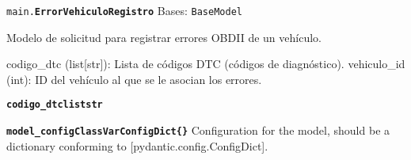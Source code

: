 \documentclass[a4paper,11pt,spanish]{sphinxmanual}
\newcommand{\robotoMonoBold}{\fontseries{b}\selectfont\ttfamily}
\renewcommand{\sphinxcode}[1]{\textcolor{sphinxorangeCode}{{\robotoMonoBold #1}}}
\renewcommand{\sphinxbfcode}[1]{\textbf{\sphinxcode{#1}}}
\renewcommand{\sphinxupquote}[1]{\texttt{#1}}
\begin{document}

\begin{fulllineitems}
\label{\detokenize{modelos:main.ErrorVehiculoRegistro}}
\pysigstartsignatures
\pysiglinewithargsret
{\sphinxbfcode{\sphinxupquote{}}\sphinxcode{\sphinxupquote{main.}}\sphinxbfcode{\sphinxupquote{ErrorVehiculoRegistro}}}
{\sphinxparamcomma {}\sphinxparamcomma {}}
{}
\pysigstopsignatures
\sphinxAtStartPar
Bases: \sphinxcode{\sphinxupquote{BaseModel}}

\sphinxAtStartPar
Modelo de solicitud para registrar errores OBD\sphinxhyphen{}II de un vehículo.
\begin{description}
\sphinxAtStartPar
codigo\_dtc (list{[}str{]}): Lista de códigos DTC (códigos de diagnóstico).
vehiculo\_id (int): ID del vehículo al que se le asocian los errores.

\end{description}

\begin{fulllineitems}
\label{\detokenize{modelos:main.ErrorVehiculoRegistro.codigo_dtc}}
\pysigstartsignatures
\pysigline
{\sphinxbfcode{\sphinxupquote{codigo\_dtc}}\sphinxbfcode{\sphinxupquote{list\DUrole{p}{{[}}str\DUrole{p}{{]}}}}}
\pysigstopsignatures
\end{fulllineitems}


\begin{fulllineitems}
\label{\detokenize{modelos:main.ErrorVehiculoRegistro.model_config}}
\pysigstartsignatures
\pysigline
{\sphinxbfcode{\sphinxupquote{model\_config}}\sphinxbfcode{\sphinxupquote{ClassVar\DUrole{p}{{[}}ConfigDict\DUrole{p}{{]}}}}\sphinxbfcode{\sphinxupquote{\DUrole{w}{ }\{\}}}}
\pysigstopsignatures
\sphinxAtStartPar
Configuration for the model, should be a dictionary conforming to {[}\sphinxtitleref{ConfigDict}{]}{[}pydantic.config.ConfigDict{]}.


\end{fulllineitems}
\end{fulllineitems}
\end{document}
